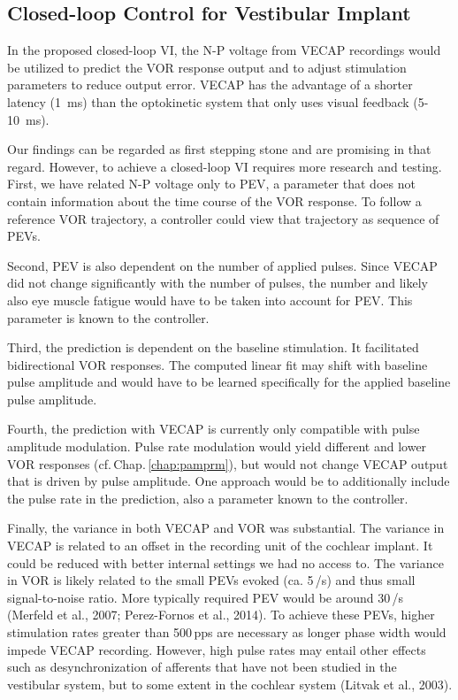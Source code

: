 \subsection{Closed-loop Control for Vestibular Implant}
In the proposed closed-loop VI, the N-P voltage from VECAP recordings would be utilized to predict the VOR response output and to adjust stimulation parameters to reduce output error. VECAP has the advantage of a shorter latency (\SI{1}{\milli\second}) than the optokinetic system that only uses visual feedback (5-\SI{10}{\milli\second}). 

Our findings can be regarded as first stepping stone and are promising in that regard. However, to achieve a closed-loop VI requires more research and testing. First, we have related N-P voltage only to PEV, a parameter that does not contain information about the time course of the VOR response. To follow a reference VOR trajectory, a controller could view that trajectory as sequence of PEVs.

Second, PEV is also dependent on the number of applied pulses. Since VECAP did not change significantly with the number of pulses, the number and likely also eye muscle fatigue would have to be taken into account for PEV. This parameter is known to the controller. 

Third, the prediction is dependent on the baseline stimulation. It facilitated bidirectional VOR responses. The computed linear fit may shift with baseline pulse amplitude and would have to be learned specifically for the applied baseline pulse amplitude.

Fourth, the prediction with VECAP is currently only compatible with pulse amplitude modulation. Pulse rate modulation would yield different and lower VOR responses (cf.\,Chap.\,\ref{chap:pamprm}), but would not change VECAP output that is driven by pulse amplitude. One approach would be to additionally include the pulse rate in the prediction, also a parameter known to the controller.

Finally, the variance in both VECAP and VOR was substantial. The variance in VECAP is related to an offset in the recording unit of the cochlear implant. It could be reduced with better internal settings  we had no access to. The variance in VOR is likely related to the small PEVs evoked (ca. 5\,\degree /s) and thus small signal-to-noise ratio. More typically required PEV would be around 30\,\degree /s (Merfeld et al., 2007; Perez-Fornos et al., 2014). To achieve these PEVs, higher stimulation rates greater than 500\,pps are necessary as longer phase width would impede VECAP recording. However, high pulse rates may entail other effects such as desynchronization of afferents that have not been studied in the vestibular system, but to some extent in the cochlear system (Litvak et al., 2003).

